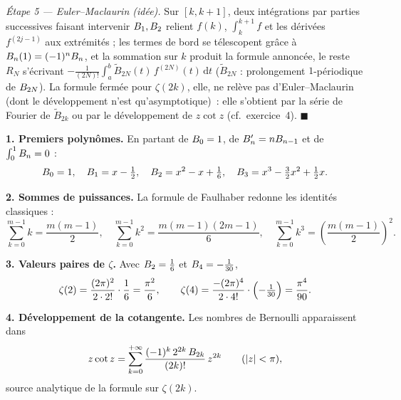 \begin{mdframed}[style=proofbar]
  \medskip
  \textit{Étape 5 — Euler--Maclaurin (idée).}
  Sur $[k,k+1]$, deux intégrations par parties successives faisant intervenir
  $B_{1},B_{2}$ relient $f(k)$, $\int_{k}^{k+1}f$ et les dérivées
  $f^{(2j-1)}$ aux extrémités ; les termes de bord se télescopent grâce à
  $B_{n}(1)=(-1)^{n}B_{n}$, et la sommation sur $k$ produit la formule
  annoncée, le reste $R_{N}$ s'écrivant
  $-\frac{1}{(2N)!}\int_{a}^{b}\widetilde{B}_{2N}(t)\,f^{(2N)}(t)\,\mathrm{d}t$
  ($\widetilde{B}_{2N}$ : prolongement $1$-périodique de $B_{2N}$).
  La formule fermée pour $\zeta(2k)$, elle, ne relève pas d'Euler--Maclaurin
  (dont le développement n'est qu'asymptotique)~: elle s'obtient par la série
  de Fourier de $\widetilde{B}_{2k}$ ou par le développement de $z\cot z$
  (cf.\ exercice~4).
  \hfill$\blacksquare$
\end{mdframed}

\decsep{}



\begin{mdframed}[style=exbar]
  \textbf{1. Premiers polynômes.}\enspace%
  En partant de $B_{0}=1$, de $B_{n}'=nB_{n-1}$ et de
  $\int_{0}^{1}B_{n}=0$ :
  \[
    B_{0}=1,\quad B_{1}=x-\tfrac{1}{2},\quad
    B_{2}=x^{2}-x+\tfrac{1}{6},\quad
    B_{3}=x^{3}-\tfrac{3}{2}x^{2}+\tfrac{1}{2}x.
  \]

  \smallskip\noindent
  \textbf{2. Sommes de puissances.}\enspace%
  La formule de Faulhaber redonne les identités classiques :
  \[
    \sum_{k=0}^{m-1}k=\frac{m(m-1)}{2},\quad
    \sum_{k=0}^{m-1}k^{2}=\frac{m(m-1)(2m-1)}{6},\quad
    \sum_{k=0}^{m-1}k^{3}=\left(\frac{m(m-1)}{2}\right)^{2}.
  \]

  \smallskip\noindent
  \textbf{3. Valeurs paires de $\zeta$.}\enspace%
  Avec $B_{2}=\tfrac{1}{6}$ et $B_{4}=-\tfrac{1}{30}$,
  \[
    \zeta(2)=\frac{(2\pi)^{2}}{2\cdot 2!}\cdot\frac{1}{6}=\frac{\pi^{2}}{6},
    \qquad
    \zeta(4)=\frac{-(2\pi)^{4}}{2\cdot 4!}\cdot\Bigl(-\tfrac{1}{30}\Bigr)
    =\frac{\pi^{4}}{90}.
  \]

  \smallskip\noindent
  \textbf{4. Développement de la cotangente.}\enspace%
  Les nombres de Bernoulli apparaissent dans
  \[
    z\cot z=\sum_{k=0}^{+\infty}\frac{(-1)^{k}\,2^{2k}\,B_{2k}}{(2k)!}\,z^{2k}
    \qquad (|z|<\pi),
  \]
  source analytique de la formule sur $\zeta(2k)$.
\end{mdframed}

